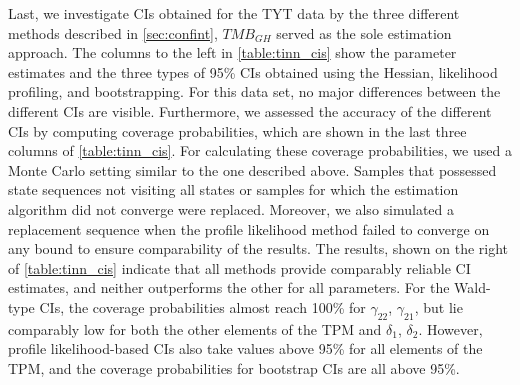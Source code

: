 \documentclass[bimj,fleqn]{w-art}\usepackage[]{graphicx}\usepackage[]{color}
\theoremstyle{plain}
\theoremstyle{definition}
\begin{document}
Last, we investigate CIs obtained for the TYT data by the three different methods described in \autoref{sec:confint}, $TMB_{GH}$ served as the sole estimation approach. The columns to the left in \autoref{table:tinn_cis} show the parameter estimates and the three types of 95\% CIs obtained using the Hessian, likelihood profiling, and bootstrapping. For this data set, no major differences between the different CIs are visible. Furthermore, we assessed the accuracy of the different CIs by computing coverage probabilities, which are shown in the last three columns of \autoref{table:tinn_cis}. For calculating these coverage probabilities, we used a Monte Carlo setting similar to the one described above. Samples that possessed state sequences not visiting all states or samples for which the estimation algorithm did not converge were replaced. Moreover, we also simulated a replacement sequence when the profile likelihood method failed to converge on any bound to ensure comparability of the results. The results, shown on the right of \autoref{table:tinn_cis} indicate that all methods provide comparably reliable CI estimates, and neither outperforms the other for all parameters. For the Wald-type CIs, the coverage probabilities almost reach 100\% for $\gamma_{22}$,  $\gamma_{21}$, but lie comparably low for both the other elements of the TPM and $\delta_1$, $\delta_2$. However, profile likelihood-based CIs also take values above 95\% for all elements of the TPM, and the coverage probabilities for bootstrap CIs are all above 95\%. 
\end{document}
